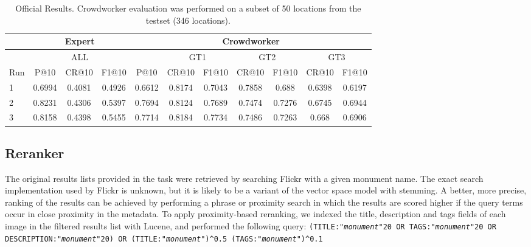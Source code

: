 \documentclass{../acm_proc_article-me11_tweaked}
\newcommand{\textapprox}{\raisebox{0.5ex}{\texttildelow}}
\begin{document}
\begin{table}[ht]
	\centering
	\small
	\caption{\label{tab:results}Official Results. Crowdworker evaluation was performed on a subset of 50 locations from the testset (346 locations).}
	\begin{tabular}{|l|||c|c|c|||c||c|c||c|c||c|c|}
		\hline
		 & \multicolumn{3}{c|||}{Expert} &  \multicolumn{7}{c|}{Crowdworker}\\
		\hline
		 & \multicolumn{3}{c|||}{ALL} &  & \multicolumn{2}{c||}{GT1} & \multicolumn{2}{c||}{GT2} & \multicolumn{2}{c|}{GT3}\\
		Run & P@10 & CR@10 & F1@10 & P@10 & CR@10 & F1@10 & CR@10 & F1@10 & CR@10 & F1@10 \\
		\hline\hline
		1 & 0.6994 & 0.4081 & 0.4926 & 0.6612 & 0.8174 & 0.7043 & 0.7858 & 0.688 & 0.6398 & 0.6197 \\
		\hline
		2 & 0.8231 & 0.4306 & 0.5397 & 0.7694 & 0.8124 & 0.7689 & 0.7474 & 0.7276 & 0.6745 & 0.6944 \\
		\hline
		3 & 0.8158 & 0.4398 & 0.5455 & 0.7714 & 0.8184 & 0.7734 & 0.7486 & 0.7263 & 0.668 & 0.6906 \\
		\hline
	\end{tabular}
\end{table}

\subsection{Reranker}
The original results lists provided in the task were retrieved by searching Flickr with a given monument name. The exact search implementation used by Flickr is unknown, but it is likely to be a variant of the vector space model with stemming. A better, more precise, ranking of the results can be achieved by performing a phrase or proximity search in which the results are scored higher if the query terms occur in close proximity in the metadata. To apply proximity-based reranking, we indexed the title, description and tags fields of each image in the filtered results list with Lucene, and performed the following query: \texttt{(TITLE:"\emph{monument}"\textapprox20 OR TAGS:"\emph{monument}"\textapprox20 OR DESCRIPTION:"\emph{monument}"\textapprox20) OR (TITLE:"\emph{monument}")\textasciicircum0.5 (TAGS:"\emph{monument}")\textasciicircum0.1}
\end{document}
